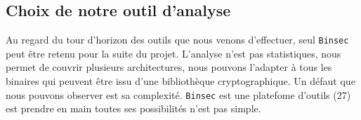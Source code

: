 \subsection*{Choix de notre outil d'analyse}

Au regard du tour d'horizon des outils que nous venons d'effectuer, seul \texttt{Binsec} peut être retenu pour la suite du projet. L'analyse n'est pas statistiques, nous permet de couvrir plusieurs architectures, nous pouvons l'adapter à tous les binaires qui peuvent être issu d'une bibliothèque cryptographique. Un défaut que nous pouvons observer est sa complexité. \texttt{Binsec} est une platefome d'outils (27) est prendre en main toutes ses possibilités n'est pas simple. 